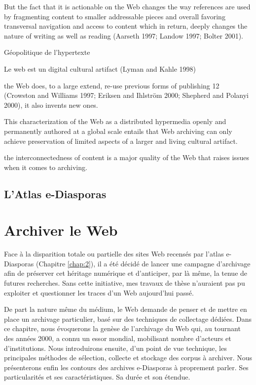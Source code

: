 \documentclass[symmetric,justified,marginals=raggedouter]{tufte-book}
\begin{document}
But the fact that it is actionable on the Web changes the way references are used by fragmenting content to smaller addressable pieces and overall favoring transversal navigation and access to content which in return, deeply changes the nature of writing as well as reading (Aarseth 1997; Landow 1997; Bolter 2001).

Géopolitique de l'hypertexte

Le web est un digital cultural artifact (Lyman and Kahle 1998)

 the Web does, to a large extend, re-use previous forms of publishing 12 (Crowston and Williams 1997; Eriksen and Ihlström 2000; Shepherd and Polanyi 2000), it also invents new ones.
 
This characterization of the Web as a distributed hypermedia openly and permanently authored at a global scale entails that Web archiving can only achieve preservation of limited aspects of a larger and living cultural artifact.

the interconnectedness of content is a major quality of the Web that raises issues when it comes to archiving.

\section{L'Atlas e-Diasporas}
\label{sec:2_atlas}


\chapter{Archiver le Web}

\noindent Face à la disparition totale ou partielle des sites Web recensés par l'atlas e-Diasporas (Chapitre \ref{chap:2}), il a été décidé de lancer une campagne d'archivage afin de préserver cet héritage numérique et d'anticiper, par là même, la tenue de futures recherches. Sans cette initiative, mes travaux de thèse n'auraient pas pu exploiter et questionner les traces d'un Web aujourd'hui passé. 

De part la nature même du médium, le Web demande de penser et de mettre en place un archivage particulier, basé sur des techniques de collectage dédiées. Dans ce chapitre, nous évoquerons la genèse de l'archivage du Web qui, au tournant des années 2000, a connu un essor mondial, mobilisant nombre d'acteurs et d'institutions. Nous introduirons ensuite, d'un point de vue technique, les principales méthodes de sélection, collecte et stockage des corpus à archiver. Nous présenterons enfin les contours des archives e-Diasporas à proprement parler. Ses particularités et ses caractéristiques. Sa durée et son étendue. \\
\end{document}
